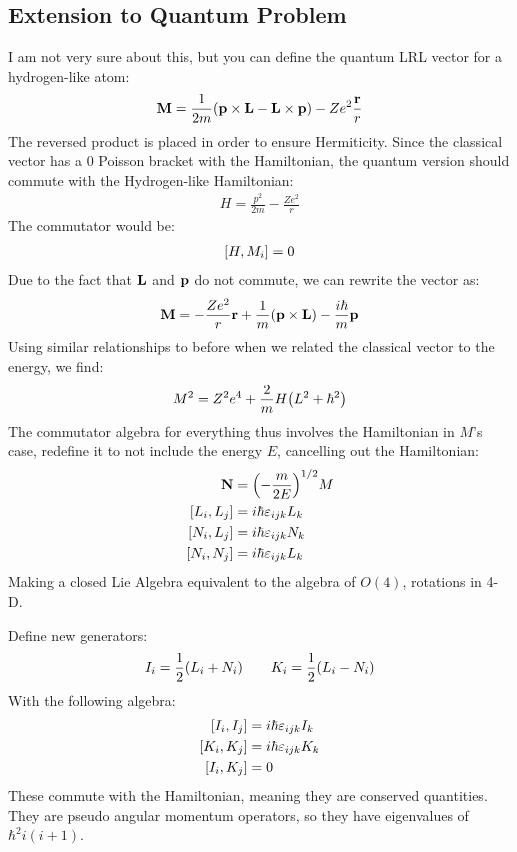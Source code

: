 \documentclass[12pt]{article}
\theoremstyle{plain}
\theoremstyle{definition}
\newcommand{\veps}{\varepsilon}
\begin{document}
\subsection{Extension to Quantum Problem}
I am not very sure about this, but you can define the quantum LRL vector for a hydrogen-like atom:
\begin{align*}
  \vb{M}=\frac{1}{2m}\qty(\vb{p\times L-L\times p})-Ze^2\frac{\vb{r}}{r}
\end{align*}
The reversed product is placed in order to ensure Hermiticity. Since the classical vector has a 0 Poisson bracket with the Hamiltonian, the quantum version should commute with the Hydrogen-like Hamiltonian:
\begin{align*}
  H=\frac{p^2}{2m}-\frac{Ze^2}{r}
\end{align*}
The commutator would be:
\begin{align*}
  \comm{H}{M_i}=0
\end{align*}
Due to the fact that $\vb{L}$ and $\vb{p}$ do not commute, we can rewrite the vector as:
\begin{align*}
  \vb{M}=-\frac{Ze^2}{r}\vb{r}+\frac1m\qty(\vb{p\times L})
  -\frac{i\hbar}{m}\vb{p}
\end{align*}
Using similar relationships to before when we related the classical vector to the energy, we find:
\begin{align*}
  M^2=Z^2e^4+\frac2mH\qty(L^2+\hbar^2)
\end{align*}
The commutator algebra for everything thus involves the Hamiltonian in $M$'s case, redefine it to not include the energy $E$, cancelling out the Hamiltonian:
\begin{align*}
  \vb{N}&=\qty(-\frac{m}{2E})^{1/2}M\\
  \comm{L_i}{L_j}&=i\hbar\veps_{ijk}L_k\\
  \comm{N_i}{L_j}&=i\hbar\veps_{ijk}N_k\\
  \comm{N_i}{N_j}&=i\hbar\veps_{ijk}L_k
\end{align*}
Making a closed Lie Algebra equivalent to the algebra of $O(4)$, rotations in 4-D.

Define new generators:
\begin{align*}
  I_i=\frac12\qty(L_i+N_i)\qquad K_i=\frac12\qty(L_i-N_i)
\end{align*}
With the following algebra:
\begin{align*}
  \comm{I_i}{I_j}&=i\hbar\veps_{ijk}I_k\\
  \comm{K_i}{K_j}&=i\hbar\veps_{ijk}K_k\\
  \comm{I_i}{K_j}&=0
\end{align*}
These commute with the Hamiltonian, meaning they are conserved quantities. They are pseudo angular momentum operators, so they have eigenvalues of $\hbar^2i(i+1)$.
\end{document}

